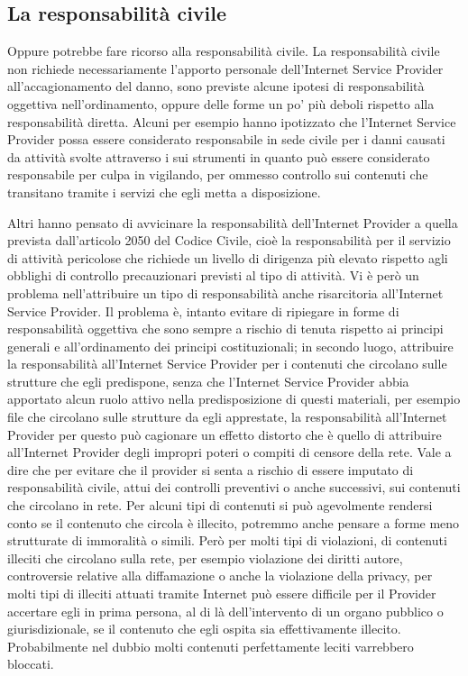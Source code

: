\subsection{La responsabilità civile}
Oppure potrebbe fare ricorso alla responsabilità civile. La responsabilità civile non richiede necessariamente l'apporto personale dell'Internet Service Provider all'accagionamento del danno, sono previste alcune ipotesi di responsabilità oggettiva nell'ordinamento, oppure delle forme un po' più deboli rispetto alla responsabilità diretta. Alcuni per esempio hanno ipotizzato che l'Internet Service Provider possa essere considerato responsabile in sede civile per i danni causati da attività svolte attraverso i sui strumenti in quanto può essere considerato responsabile per culpa in vigilando, per ommesso controllo sui contenuti che transitano tramite i servizi che egli metta a disposizione. 

Altri hanno pensato di avvicinare la responsabilità dell'Internet Provider a quella prevista dall'articolo 2050 del Codice Civile, cioè la responsabilità per il servizio di attività pericolose che richiede un livello di dirigenza più elevato rispetto agli obblighi di controllo precauzionari previsti al tipo di attività. Vi è però un problema nell'attribuire un tipo di responsabilità anche risarcitoria all'Internet Service Provider. Il problema è, intanto evitare di ripiegare in forme di responsabilità oggettiva che sono sempre a rischio di tenuta rispetto ai principi generali e all'ordinamento dei principi costituzionali; in secondo luogo, attribuire la responsabilità all'Internet Service Provider per i contenuti che circolano sulle strutture che egli predispone, senza che l'Internet Service Provider abbia apportato alcun ruolo attivo nella predisposizione di questi materiali, per esempio file che circolano sulle strutture da egli apprestate, la responsabilità all'Internet Provider per questo può cagionare un effetto distorto che è quello di attribuire all'Internet Provider degli impropri poteri o compiti di censore della rete. Vale a dire che per evitare che il provider si senta a rischio di essere imputato di responsabilità civile, attui dei controlli preventivi o anche successivi, sui contenuti che circolano in rete.
Per alcuni tipi di contenuti si può agevolmente rendersi conto se il contenuto che circola è illecito, potremmo anche pensare a forme meno strutturate di immoralità o simili. Però per molti tipi di violazioni, di contenuti illeciti che circolano sulla rete, per esempio violazione dei diritti autore, controversie relative alla diffamazione o anche la violazione della privacy, per molti tipi di illeciti attuati tramite Internet può essere difficile per il Provider accertare egli in prima persona, al di là dell'intervento di un organo pubblico o giurisdizionale,  se il contenuto che egli ospita sia effettivamente illecito. Probabilmente nel dubbio molti contenuti perfettamente leciti varrebbero bloccati. 

